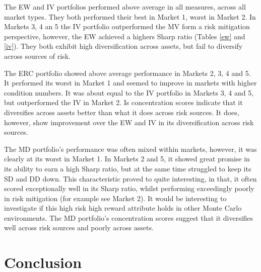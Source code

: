 \documentclass[11pt,preprint, authoryear]{elsarticle}
\numberwithin{equation}{section}
\numberwithin{figure}{section}
\numberwithin{table}{section}
\begin{document}
The EW and IV portfolios performed above average in all measures, across
all market types. They both performed their best in Market 1, worst in
Market 2. In Markets 3, 4 an 5 the IV portfolio outperformed the MV form
a risk mitigation perspective, however, the EW achieved a highers Sharp
ratio (Tables \ref{ew} and \ref{iv}). They both exhibit high
diversification across assets, but fail to diversify across sources of
risk.

The ERC portfolio showed above average performance in Markets 2, 3, 4
and 5. It performed its worst in Market 1 and seemed to improve in
markets with higher condition numbers. It was about equal to the IV
portfolio in Markets 3, 4 and 5, but outperformed the IV in Market 2. Is
concentration scores indicate that it diversifies across assets better
than what it does across risk sources. It does, however, show
improvement over the EW and IV in its diversification across risk
sources.

The MD portfolio's performance was often mixed within markets, however,
it was clearly at its worst in Market 1. In Markets 2 and 5, it showed
great promise in its ability to earn a high Sharp ratio, but at the same
time struggled to keep its SD and DD down. This characteristic proved to
quite interesting, in that, it often scored exceptionally well in its
Sharp ratio, whilst performing exceedingly poorly in risk mitigation
(for example see Market 2). It would be interesting to investigate if
this high risk high reward attribute holds in other Monte Carlo
environments. The MD portfolio's concentration scores suggest that it
diversifies well across risk sources and poorly across assets.

\hypertarget{conclusion}{%
\section{\texorpdfstring{Conclusion
\label{conclusion}}{Conclusion }}\label{conclusion}}
\end{document}
